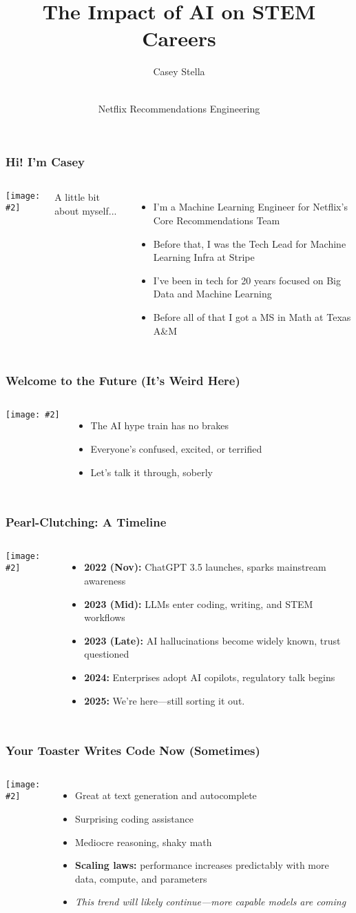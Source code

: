 \documentclass{beamer}
\title{The Impact of AI on STEM Careers}
\author{Casey Stella}
\date{\\Netflix Recommendations Engineering}
\newcommand{\slidewithimage}[3]{%
  \begin{frame}
    \frametitle{#1}
    \begin{columns}
      \column{0.5\textwidth}
        \texttt{[image: \#2]}\\[1em]
      \column{0.5\textwidth}
        #3
    \end{columns}
  \end{frame}
}
\begin{document}
\begin{frame}
  \titlepage
\end{frame}

\slidewithimage{Hi! I'm Casey}{me-and-robot.png}{
  A little bit about myself...
  \begin{itemize}
    \item I'm a Machine Learning Engineer for Netflix's Core Recommendations Team
    \item Before that, I was the Tech Lead for Machine Learning Infra at Stripe
    \item I've been in tech for 20 years focused on Big Data and Machine Learning
    \item Before all of that I got a MS in Math at Texas A\&M
  \end{itemize}
}

\slidewithimage{Welcome to the Future (It’s Weird Here)}{future-image.png}{
  \begin{itemize}
    \item The AI hype train has no brakes
    \item Everyone’s confused, excited, or terrified
    \item Let's talk it through, soberly
  \end{itemize}
}

\slidewithimage{Pearl-Clutching: A Timeline}{timeline-image.png}{
  \begin{itemize}
    \item \textbf{2022 (Nov):} ChatGPT 3.5 launches, sparks mainstream awareness
    \item \textbf{2023 (Mid):} LLMs enter coding, writing, and STEM workflows
    \item \textbf{2023 (Late):} AI hallucinations become widely known, trust questioned
    \item \textbf{2024:} Enterprises adopt AI copilots, regulatory talk begins
    \item \textbf{2025:} We’re here—still sorting it out.
  \end{itemize}
}

\slidewithimage{Your Toaster Writes Code Now (Sometimes)}{capabilities-image.png}{
  \begin{itemize}
    \item Great at text generation and autocomplete
    \item Surprising coding assistance
    \item Mediocre reasoning, shaky math
    \item \textbf{Scaling laws:} performance increases predictably with more data, compute, and parameters
    \item \textit{This trend will likely continue—more capable models are coming}
  \end{itemize}
}
\end{document}
